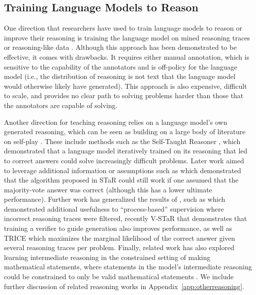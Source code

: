 \documentclass{article} %
\begin{document}
\subsection{Training Language Models to Reason}
One direction that researchers have used to train language models to reason or improve their reasoning is training the language model on mined reasoning traces or reasoning-like data \citep{rajani2019explain,wei2021finetuned,lewkowycz2022solving,chung2022scaling,gunasekar2023textbooks}. Although this approach has been demonstrated to be effective, it comes with drawbacks. It requires either manual annotation, which is sensitive to the capability of the annotators and is off-policy for the language model (i.e., the distribution of reasoning is not text that the language model would otherwise likely have generated). This approach is also expensive, difficult to scale, and provides no clear path to solving problems harder than those that the annotators are capable of solving.

Another direction for teaching reasoning relies on a language model's own generated reasoning, which can be seen as building on a large body of literature on self-play \citep{silver2017mastering,anthony2017thinking,polu_generative_2020}. These include methods such as the Self-Taught Reasoner \citep{zelikman2022star}, which demonstrated that a language model iteratively trained on its reasoning that led to correct answers could solve increasingly difficult problems. Later work aimed to leverage additional information or assumptions such as \citet{huang2022large} which demonstrated that the algorithm proposed in STaR could still work if one assumed that the majority-vote answer was correct (although this has a lower ultimate performance). Further work has generalized the results of \citet{zelikman2022star}, such as \citet{uesato2022solving} which demonstrated additional usefulness to ``process-based'' supervision where incorrect reasoning traces were filtered, recently V-STaR \citep{hosseini2024v} that demonstrates that training a verifier to guide generation also improves performance, as well as TRICE \citep{hoffman2024training} which maximizes the marginal likelihood of the correct answer given several reasoning traces per problem. Finally, related work has also explored learning intermediate reasoning in the constrained setting of making mathematical statements, where statements in the model's intermediate reasoning could be constrained to only be valid mathematical statements \citep{poesia2023certified}. We include further discussion of related reasoning works in Appendix~\ref{app:otherreasoning}.
\end{document}

